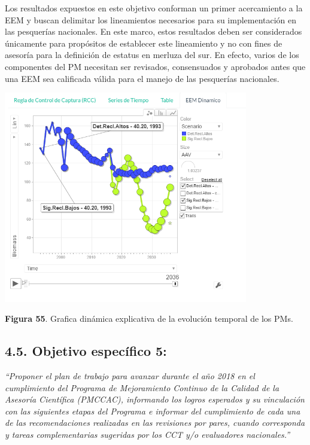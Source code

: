 \documentclass[
  spanish,
]{article}
\begin{document}
Los resultados expuestos en este objetivo conforman un primer
acercamiento a la EEM y buscan delimitar los lineamientos necesarios
para su implementación en las pesquerías nacionales. En este marco,
estos resultados deben ser considerados únicamente para propósitos de
establecer este lineamiento y no con fines de asesoría para la
definición de estatus en merluza del sur. En efecto, varios de los
componentes del PM necesitan ser revisados, consensuados y aprobados
antes que una EEM sea calificada válida para el manejo de las pesquerías
nacionales.

\begin{center}
\includegraphics[width=0.8\textwidth]{Figuras/Figura_55.png}
\end{center}

\small \textbf{Figura 55}. Grafica dinámica explicativa de la evolución
temporal de los PMs. \vspace{0.5cm} \normalsize

\hypertarget{objetivo-especuxedfico-5-1}{%
\subsection{4.5. Objetivo específico
5:}\label{objetivo-especuxedfico-5-1}}

\emph{``Proponer el plan de trabajo para avanzar durante el año 2018 en
el cumplimiento del Programa de Mejoramiento Continuo de la Calidad de
la Asesoría Científica (PMCCAC), informando los logros esperados y su
vinculación con las siguientes etapas del Programa e informar del
cumplimiento de cada una de las recomendaciones realizadas en las
revisiones por pares, cuando corresponda y tareas complementarias
sugeridas por los CCT y/o evaluadores nacionales.''}
\end{document}
